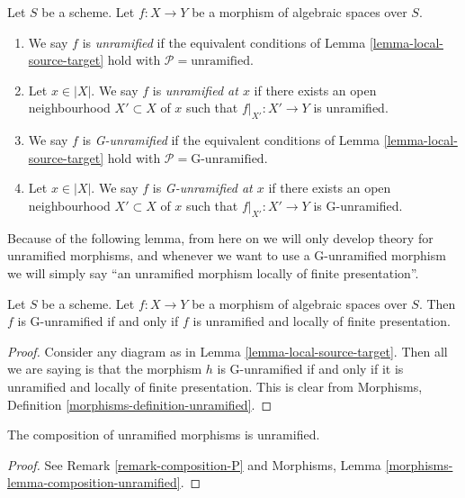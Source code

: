 \begin{definition}
\label{definition-unramified}
Let $S$ be a scheme.
Let $f : X \to Y$ be a morphism of algebraic spaces over $S$.
\begin{enumerate}
\item We say $f$ is {\it unramified} if the equivalent conditions of
Lemma \ref{lemma-local-source-target}
hold with $\mathcal{P} = \text{unramified}$.
\item Let $x \in |X|$. We say $f$ is {\it unramified at $x$} if there
exists an open neighbourhood $X' \subset X$ of $x$ such that
$f|_{X'} : X' \to Y$ is unramified.
\item We say $f$ is {\it G-unramified} if the equivalent conditions of
Lemma \ref{lemma-local-source-target}
hold with $\mathcal{P} = \text{G-unramified}$.
\item Let $x \in |X|$. We say $f$ is {\it G-unramified at $x$} if there
exists an open neighbourhood $X' \subset X$ of $x$ such that
$f|_{X'} : X' \to Y$ is G-unramified.
\end{enumerate}
\end{definition}

\noindent
Because of the following lemma, from here on we will only develop theory
for unramified morphisms, and whenever we want to use a G-unramified
morphism we will simply say ``an unramified morphism locally of finite
presentation''.

\begin{lemma}
\label{lemma-unramified-G-unramified}
Let $S$ be a scheme.
Let $f : X \to Y$ be a morphism of algebraic spaces over $S$.
Then $f$ is G-unramified if and only if $f$ is unramified and
locally of finite presentation.
\end{lemma}

\begin{proof}
Consider any diagram as in
Lemma \ref{lemma-local-source-target}.
Then all we are saying is that the morphism $h$ is
G-unramified if and only if it is unramified and locally of finite
presentation. This is clear from
Morphisms, Definition \ref{morphisms-definition-unramified}.
\end{proof}

\begin{lemma}
\label{lemma-composition-unramified}
The composition of unramified morphisms is unramified.
\end{lemma}

\begin{proof}
See Remark \ref{remark-composition-P} and
Morphisms, Lemma \ref{morphisms-lemma-composition-unramified}.
\end{proof}

